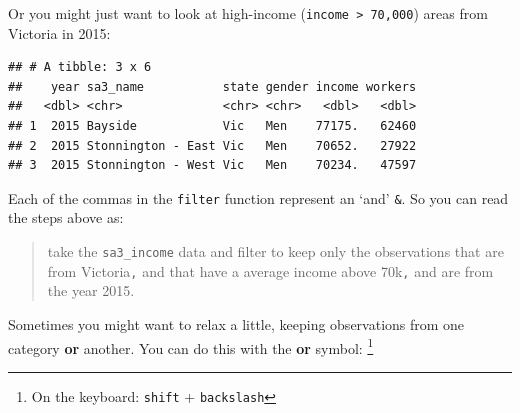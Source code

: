 \documentclass[]{book}
\newenvironment{Shaded}{\begin{snugshade}}{\end{snugshade}}
\newcommand{\DecValTok}[1]{\textcolor[rgb]{0.00,0.00,0.81}{#1}}
\newcommand{\KeywordTok}[1]{\textcolor[rgb]{0.13,0.29,0.53}{\textbf{#1}}}
\newcommand{\NormalTok}[1]{#1}
\newcommand{\OperatorTok}[1]{\textcolor[rgb]{0.81,0.36,0.00}{\textbf{#1}}}
\newcommand{\StringTok}[1]{\textcolor[rgb]{0.31,0.60,0.02}{#1}}
\begin{document}
Or you might just want to look at high-income (\texttt{income\ \textgreater{}\ 70,000}) areas from Victoria in 2015:

\begin{Shaded}
\end{Shaded}

\begin{verbatim}
## # A tibble: 3 x 6
##    year sa3_name           state gender income workers
##   <dbl> <chr>              <chr> <chr>   <dbl>   <dbl>
## 1  2015 Bayside            Vic   Men    77175.   62460
## 2  2015 Stonnington - East Vic   Men    70652.   27922
## 3  2015 Stonnington - West Vic   Men    70234.   47597
\end{verbatim}

Each of the commas in the \texttt{filter} function represent an `and' \texttt{\&}. So you can read the steps above as:

\begin{quote}
take the \texttt{sa3\_income} data and filter to keep only the observations that are from Victoria\texttt{,} and that have a average income above 70k\texttt{,} and are from the year 2015.
\end{quote}

Sometimes you might want to relax a little, keeping observations from one category \textbf{or} another. You can do this with the \textbf{or} symbol: \texttt{\textbar{}}\footnote{On the keyboard: \texttt{shift} + \texttt{backslash}}

\begin{Shaded}
\end{Shaded}
\end{document}
